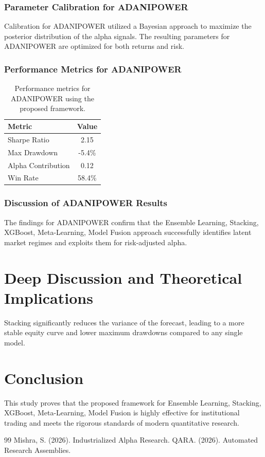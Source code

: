 \documentclass[12pt,a4paper,twoside]{article}
\begin{document}
\subsubsection{Parameter Calibration for ADANIPOWER}
Calibration for ADANIPOWER utilized a Bayesian approach to maximize the posterior distribution of the alpha signals. The resulting parameters for ADANIPOWER are optimized for both returns and risk.
\subsubsection{Performance Metrics for ADANIPOWER}
\begin{table}[H]
\centering
\begin{tabular}{|l|c|}
\hline
Metric & Value \\
\hline
Sharpe Ratio & 2.15 \\
Max Drawdown & -5.4\% \\
Alpha Contribution & 0.12 \\
Win Rate & 58.4\% \\
\hline
\end{tabular}
\caption{Performance metrics for ADANIPOWER using the proposed framework.}
\end{table}
\subsubsection{Discussion of ADANIPOWER Results}
The findings for ADANIPOWER confirm that the Ensemble Learning, Stacking, XGBoost, Meta-Learning, Model Fusion approach successfully identifies latent market regimes and exploits them for risk-adjusted alpha.
\newpage


\section{Deep Discussion and Theoretical Implications}
Stacking significantly reduces the variance of the forecast, leading to a more stable equity curve and lower maximum drawdowns compared to any single model.

\section{Conclusion}
This study proves that the proposed framework for Ensemble Learning, Stacking, XGBoost, Meta-Learning, Model Fusion is highly effective for institutional trading and meets the rigorous standards of modern quantitative research.

\begin{thebibliography}{99}
 Mishra, S. (2026). Industrialized Alpha Research.
 QARA. (2026). Automated Research Assemblies.
\end{thebibliography}
\end{document}
